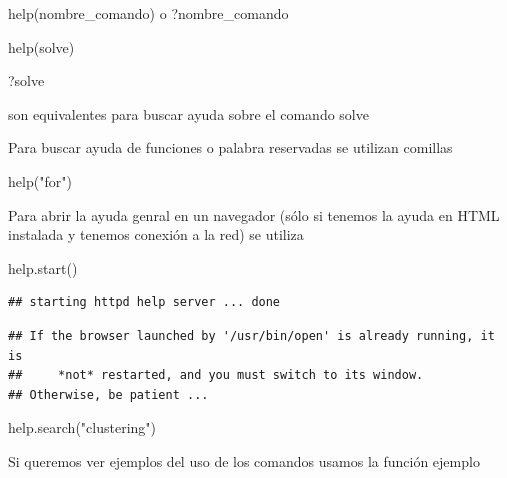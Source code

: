 \documentclass[
]{book}
\newenvironment{Shaded}{\begin{snugshade}}{\end{snugshade}}
\newcommand{\FunctionTok}[1]{\textcolor[rgb]{0.00,0.00,0.00}{#1}}
\newcommand{\NormalTok}[1]{#1}
\newcommand{\StringTok}[1]{\textcolor[rgb]{0.31,0.60,0.02}{#1}}
\begin{document}
help(nombre\_comando) o ?nombre\_comando

\begin{Shaded}
\begin{Highlighting}[]
\FunctionTok{help}\NormalTok{(solve)}
\end{Highlighting}
\end{Shaded}

\begin{Shaded}
\begin{Highlighting}[]
\NormalTok{?solve}
\end{Highlighting}
\end{Shaded}

son equivalentes para buscar ayuda sobre el comando solve

Para buscar ayuda de funciones o palabra reservadas se utilizan comillas

\begin{Shaded}
\begin{Highlighting}[]
\FunctionTok{help}\NormalTok{(}\StringTok{"for"}\NormalTok{)}
\end{Highlighting}
\end{Shaded}

Para abrir la ayuda genral en un navegador (sólo si tenemos la ayuda en HTML instalada y tenemos conexión a la red) se utiliza

\begin{Shaded}
\begin{Highlighting}[]
\FunctionTok{help.start}\NormalTok{()}
\end{Highlighting}
\end{Shaded}

\begin{verbatim}
## starting httpd help server ... done
\end{verbatim}

\begin{verbatim}
## If the browser launched by '/usr/bin/open' is already running, it is
##     *not* restarted, and you must switch to its window.
## Otherwise, be patient ...
\end{verbatim}

\begin{Shaded}
\begin{Highlighting}[]
\FunctionTok{help.search}\NormalTok{(}\StringTok{"clustering"}\NormalTok{)}
\end{Highlighting}
\end{Shaded}

Si queremos ver ejemplos del uso de los comandos usamos la función ejemplo
\end{document}
